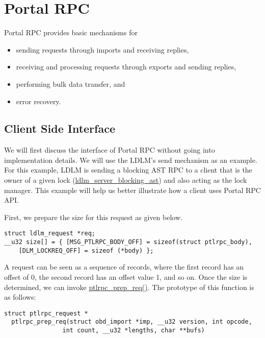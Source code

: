 \section{Portal RPC}

Portal RPC provides basic mechanisms for

\begin{itemize}

  \item sending requests through imports and receiving replies,

  \item receiving and processing requests through exports and sending replies,

  \item performing bulk data transfer, and

  \item error recovery.

\end{itemize}

\subsection{Client Side Interface}

We will first discuss the interface of Portal RPC without going into
implementation details. We will use the LDLM's send mechanism as an example.
For this example, LDLM is sending a blocking AST RPC to a client that is
the owner of a given lock (\url{ldlm_server_blocking_ast}) and also acting as
the lock manager. This example will help us better illustrate how a client uses
Portal RPC API.  

First, we prepare the size for this request as given below.

\begin{Verbatim}
struct ldlm_request *req;
__u32 size[] = { [MSG_PTLRPC_BODY_OFF] = sizeof(struct ptlrpc_body),
    [DLM_LOCKREQ_OFF] = sizeof (*body) };
\end{Verbatim}

A request can be seen as a sequence of records, where the first record has an
offset of 0, the second record has an offset value 1, and so on. Once the size
is determined, we can invoke \url{ptlrpc_prep_req()}. The prototype of this
function is as follows:

\begin{Verbatim}
struct ptlrpc_request *
  ptlrpc_prep_req(struct obd_import *imp, __u32 version, int opcode, 
                int count, __u32 *lengths, char **bufs)
\end{Verbatim}

